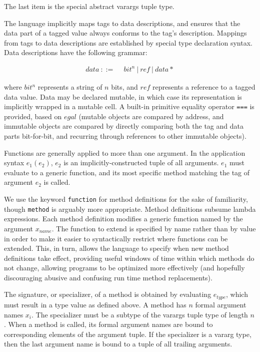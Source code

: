 \noindent
The last item is the special abstract varargs tuple type.

The language implicitly maps tags to data descriptions, and ensures that
the data part of a tagged value always conforms to the tag's description.
Mappings from tags to data descriptions are established by special type
declaration syntax. Data descriptions have the following grammar:

\vspace{-3ex}
\begin{singlespace}
\begin{align*}
data\ ::=\ &\ bit^n\ |\ ref\ |\ data*
\end{align*}
\end{singlespace}

\noindent
where $bit^n$ represents a string of $n$ bits, and $ref$ represents a reference
to a tagged data value. Data may be declared mutable, in which case its
representation is implicitly wrapped in a mutable cell. A built-in primitive
equality operator \texttt{===} is provided, based on $egal$ \cite{egal}
(mutable objects are compared by address, and immutable objects are compared
by directly comparing both the tag and data parts bit-for-bit, and recurring
through references to other immutable objects).

Functions are generally applied to more than one argument. In the application
syntax $e_1(e_2)$, $e_2$ is an implicitly-constructed tuple of all arguments.
$e_1$ must evaluate to a generic function, and its most specific method
matching the tag of argument $e_2$ is called.

We use the keyword \texttt{function} for method definitions for the sake of
familiarity, though \texttt{method} is arguably more appropriate. Method
definitions subsume lambda expressions. Each method definition modifies a
generic function named by the argument $x_{name}$. The function to extend is
specified by name rather than by value in order to make it easier to syntactically
restrict where functions can be extended. This, in turn, allows the language to
specify when new method definitions take effect, providing useful windows of
time within which methods do not change, allowing programs to be optimized more
effectively (and hopefully discouraging abusive and confusing run time
method replacements).

The signature, or specializer, of a method is obtained by evaluating $e_{type}$,
which must result in a type value as defined above. A method has $n$
formal argument names $x_i$. The specializer must be a subtype of the
varargs tuple type of length $n$. When a method is called, its formal argument
names are bound to corresponding elements of the argument tuple. If the
specializer is a vararg type, then the last argument name is bound to a
tuple of all trailing arguments.


